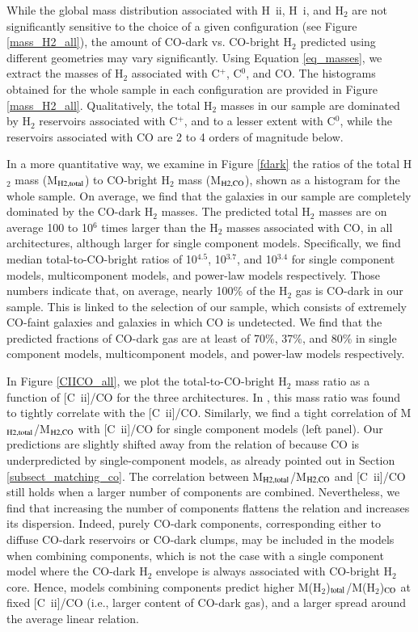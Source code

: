 \documentclass{aa}
\newcommand{\hi}{H~{\sc i}}
\newcommand{\hii}{H~{\sc ii}}
\newcommand{\cii}{[C~{\sc ii}]}
\begin{document}
While the global mass distribution associated with \hii, \hi, and H$_2$ are not significantly sensitive to the choice of a given configuration (see Figure \ref{mass_H2_all}), the amount of CO-dark vs. CO-bright H$_2$ predicted using different geometries may vary significantly. Using Equation \ref{eq_masses}, we extract the masses of H$_2$ associated with C$^+$, C$^0$, and CO. The histograms obtained for the whole sample in each configuration are provided in Figure \ref{mass_H2_all}. Qualitatively, the total H$_2$ masses in our sample are dominated by H$_2$ reservoirs associated with C$^+$, and to a lesser extent with C$^0$, while the reservoirs associated with CO are 2 to 4 orders of magnitude below. 

In a more quantitative way, we examine in Figure \ref{fdark} the ratios of the total H$_2$ mass (M$_{\rm H2, total}$) to CO-bright H$_2$ mass (M$_{\rm H2, CO}$), shown as a histogram for the whole sample. 
On average, we find that the galaxies in our sample are completely dominated by the CO-dark H$_2$ masses. The predicted total H$_2$ masses are on average 100 to 10$^6$ times larger than the H$_2$ masses associated with CO, in all architectures, although larger for single component models. Specifically, we find median total-to-CO-bright ratios of 10$^{4.5}$, 10$^{3.7}$, and 10$^{3.4}$ for single component models, multicomponent models, and power-law models respectively. Those numbers indicate that, on average, nearly 100\% of the H$_2$ gas is CO-dark in our sample. This is linked to the selection of our sample, which consists of extremely CO-faint galaxies and galaxies in which CO is undetected. We find that the predicted fractions of CO-dark gas are at least of 70\%, 37\%, and 80\% in single component models, multicomponent models, and power-law models respectively.

In Figure \ref{CIICO_all}, we plot the total-to-CO-bright H$_2$ mass ratio as a function of \cii/CO for the three architectures. In , this mass ratio was found to tightly correlate with the \cii/CO. Similarly, we find a tight correlation of M$_{\rm H2, total}$/M$_{\rm H2, CO}$ with \cii/CO for single component models (left panel). Our predictions are slightly shifted away from the relation of  because CO is underpredicted by single-component models, as already pointed out in Section \ref{subsect_matching_co}. The correlation between M$_{\rm H2, total}$/M$_{\rm H2, CO}$ and \cii/CO still holds when a larger number of components are combined. Nevertheless, we find that increasing the number of components flattens the relation and increases its dispersion.
Indeed, purely CO-dark components, corresponding either to diffuse CO-dark reservoirs or CO-dark clumps, may be included in the models when combining components, which is not the case with a single component model where the CO-dark H$_2$ envelope is always associated with CO-bright H$_2$ core. Hence, models combining components predict higher M(H$_{2}$)$_{\rm total}$/M(H$_{2}$)$_{\rm CO}$ at fixed \cii/CO (i.e., larger content of CO-dark gas), and a larger spread around the average linear relation.
\end{document}
